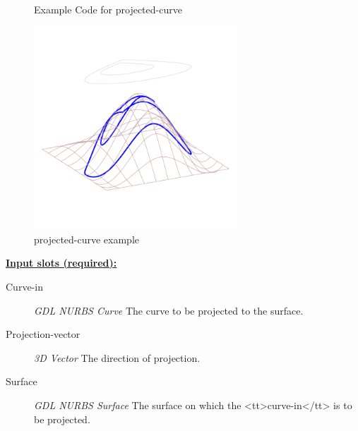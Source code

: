 \documentclass [11pt]{book}
\begin{document}
\begin{itemize}
\begin{figure}
\begin{lrbox}{\boxedverb}
\begin{minipage}{\linewidth}
{\begin{verbatim}
 
\end{verbatim}}
\end{minipage}
\end{lrbox}
\fbox{\usebox{\boxedverb}}

\caption{Example Code for projected-curve}

\label{fig:example-code-projected-curve}

\end{figure}

\begin{figure}
\begin{center}
\includegraphics[width=3in,height=3in]{../images/example-projected-curve.pdf}
\end{center}

\caption{projected-curve example}

\label{fig:projected-curve}

\end{figure}





\textbf{
\underline{Input slots (required):}}

\begin{description}

\item [Curve-in]
\emph{GDL NURBS Curve} The curve to be projected to the surface.


\item [Projection-vector]
\emph{3D Vector} The direction of projection.


\item [Surface]
\emph{GDL NURBS Surface} The surface on which the <tt>curve-in</tt> is to be projected.



\end{description}
\end{itemize}
\end{document}
